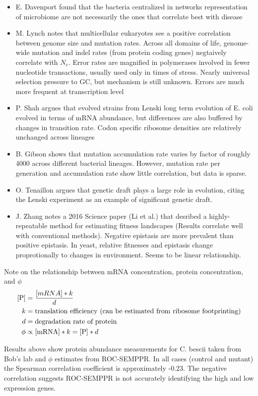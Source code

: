 \documentclass[11pt]{labbook}
\begin{document}
\begin{itemize}
\item E. Davenport found that the bacteria centralized in networks representation of microbiome are not necessarily the ones that correlate best with disease
\item M. Lynch notes that multicellular eukaryotes see a positive correlation between genome size and mutation rates. Across all domains of life, genome-wide mutation and indel rates (from protein coding genes) negtaively correlate with $N_e$. Error rates are magnified in polymerases involved in fewer nucleotide transactions, usually used only in times of stress. Nearly universal selection pressure to GC, but mechanism is still unknown. Errors are much more frequent at transcription level
\item P. Shah argues that evolved strains from Lenski long term evolution of E. coli evolved in terms of mRNA abundance, but differences are also buffered by changes in transition rate. Codon specific ribosome densities are relatively unchanged across lineages
\item B. Gibson shows that mutation accumulation rate varies by factor of roughly 4000 across different bacterial lineages. However, mutation rate per generation and accumulation rate show little correlation, but data is sparse. 
\item O. Tenaillon argues that genetic draft plays a large role in evolution, citing the Lenski experiment as an example of significant genetic draft.
\item J. Zhang notes a 2016 Science paper (Li et al.) that desribed a highly-repeatable method for estimating fitness landscapes (Results correlate well with conventional methods). Negative epistasis are more prevalent than positive epistasis. In yeast, relative fitnesses and epistasis change proprotionally to changes in environment. Seems to be linear relationship.    
\end{itemize}

Note on the relationship between mRNA concentration, protein concentration, and $\phi$
\begin{align*}
\text{[P]} &= \frac{\text[mRNA] * k}{d} \\
k &= \text{translation efficiency (can be estimated from ribosome  footprinting)} \\
d &= \text{degradation rate of protein}\\
\phi &\propto \text{[mRNA]} * k = \text{[P]} * d 
\end{align*}



Results above show protein abundance measurements for C. bescii taken from Bob's lab and $\phi$ estimates from ROC-SEMPPR. In all cases (control and mutant) the Spearman correlation coefficient is approximately -0.23. The negative correlation suggests ROC-SEMPPR is not accurately identifying the high and low expression genes.


{}
\end{document}

